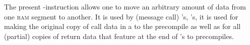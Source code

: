 The present \mmuMod{}-instruction allows one to move an arbitrary amount of data from one \textsc{ram} segment to another.
It is used by (message call) 's, 's, it is used for making the original copy of call data in a  to the  precompile as well as for all (partial) copies of return data that feature at the end of 's to precompiles.

